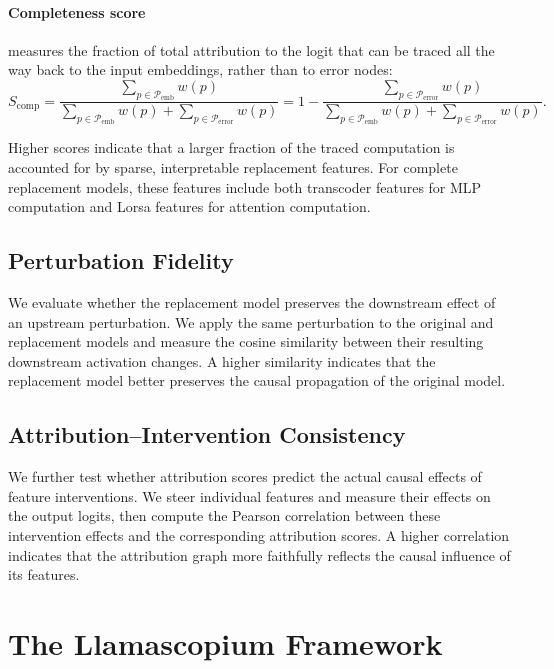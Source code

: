 \documentclass{article}
\begin{document}
\paragraph{Completeness score} measures the fraction of total attribution to the 
logit that can be traced all the way back to the input embeddings,
rather than to error nodes:
\begin{equation}
S_{\mathrm{comp}}
=
\frac{
    \sum_{p \in \mathcal{P}_{\mathrm{emb}}} w(p)
}{
    \sum_{p \in \mathcal{P}_{\mathrm{emb}}} w(p)
    +
    \sum_{p \in \mathcal{P}_{\mathrm{error}}} w(p)
}
=
1 -
\frac{
    \sum_{p \in \mathcal{P}_{\mathrm{error}}} w(p)
}{
    \sum_{p \in \mathcal{P}_{\mathrm{emb}}} w(p)
    +
    \sum_{p \in \mathcal{P}_{\mathrm{error}}} w(p)
}.
\label{eq:completeness_score}
\end{equation}

Higher scores indicate that a larger fraction of the traced computation is
accounted for by sparse, interpretable replacement features.
For complete replacement models, these features include both transcoder
features for MLP computation and Lorsa features for attention computation.

\subsection{Perturbation Fidelity}

We evaluate whether the replacement model preserves the downstream effect of
an upstream perturbation. We apply the same perturbation to the original and
replacement models and measure the cosine similarity between their resulting
downstream activation changes. A higher similarity indicates that the
replacement model better preserves the causal propagation of the original model.

\subsection{Attribution--Intervention Consistency}

We further test whether attribution scores predict the actual causal effects of
feature interventions. We steer individual features and measure their effects
on the output logits, then compute the Pearson correlation between these
intervention effects and the corresponding attribution scores. A higher
correlation indicates that the attribution graph more faithfully reflects the
causal influence of its features.


\section{The Llamascopium Framework}
\label{sec:llamascopium}
\end{document}
